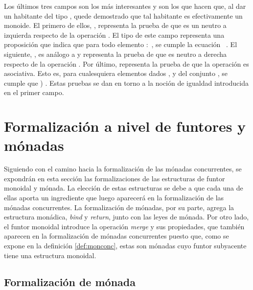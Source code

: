 Los últimos tres campos son los más interesantes y son los que hacen que, al dar un habitante del tipo , quede demostrado que tal habitante es efectivamente un monoide. El primero de ellos, , representa la prueba de que  es un neutro a izquierda respecto de la operación . El tipo de este campo representa una proposición que indica que para todo elemento  $:$ , se cumple la ecuación \hbox{\AgdaSymbol{(}  \AgdaSymbol{)}  }. El siguiente, , es análogo a  y representa la prueba de que  es neutro a derecha respecto de la operación . Por último,  representa la prueba de que la operación  es asociativa. Esto es, para cualesquiera elementos dados ,  y  del conjunto , se cumple que \AgdaSymbol{(}  \AgdaSymbol{(}  \AgdaSymbol{))}  \AgdaSymbol{((}  \AgdaSymbol)  \AgdaSymbol{)}. Estas pruebas se dan en torno a la noción de igualdad introducida en el primer campo.

\section{Formalización a nivel de funtores y mónadas}\label{form:funtmon}

Siguiendo con el camino hacia la formalización de las mónadas concurrentes, se expondrán en esta sección las formalizaciones de las estructuras de funtor monoidal y mónada. La elección de estas estructuras se debe a que cada una de ellas aporta un ingrediente que luego aparecerá en la formalización de las mónadas concurrentes. La formalización de mónadas, por su parte, agrega la estructura monádica, \textit{bind} y \textit{return}, junto con las leyes de mónada. Por otro lado, el funtor monoidal introduce la operación \textit{merge} y sus propiedades, que también aparecen en la formalización de mónadas concurrentes puesto que, como se expone en la definición \ref{def:monconc}, estas son mónadas cuyo funtor subyacente tiene una estructura monoidal.

\subsection{Formalización de mónada}\label{funtmon:mon}

